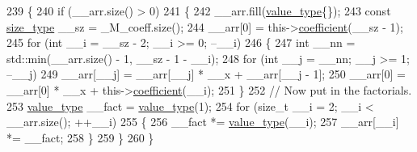 \begin{DoxyCode}
239         \{
240           \textcolor{keywordflow}{if} (\_\_arr.size() > 0)
241             \{
242               \_\_arr.fill(\hyperlink{class____gnu__cxx_1_1__StaticPolynomial_af23110f5a002cd6caa3542df7cf35284}{value\_type}\{\});
243               \textcolor{keyword}{const} \hyperlink{class____gnu__cxx_1_1__StaticPolynomial_a3384ce6a956ad398fc995e6ee53b2b18}{size\_type} \_\_sz = \_M\_coeff.size();
244               \_\_arr[0] = this->\hyperlink{class____gnu__cxx_1_1__StaticPolynomial_a412fc570171031ff0f45db048dfda225}{coefficient}(\_\_sz - 1);
245               \textcolor{keywordflow}{for} (\textcolor{keywordtype}{int} \_\_i = \_\_sz - 2; \_\_i >= 0; --\_\_i)
246                 \{
247                   \textcolor{keywordtype}{int} \_\_nn = std::min(\_\_arr.size() - 1, \_\_sz - 1 - \_\_i);
248                   \textcolor{keywordflow}{for} (\textcolor{keywordtype}{int} \_\_j = \_\_nn; \_\_j >= 1; --\_\_j)
249                     \_\_arr[\_\_j] = \_\_arr[\_\_j] * \_\_x + \_\_arr[\_\_j - 1];
250                   \_\_arr[0] = \_\_arr[0] * \_\_x + this->\hyperlink{class____gnu__cxx_1_1__StaticPolynomial_a412fc570171031ff0f45db048dfda225}{coefficient}(\_\_i);
251                 \}
252               \textcolor{comment}{//  Now put in the factorials.}
253               \hyperlink{class____gnu__cxx_1_1__StaticPolynomial_af23110f5a002cd6caa3542df7cf35284}{value\_type} \_\_fact = \hyperlink{class____gnu__cxx_1_1__StaticPolynomial_af23110f5a002cd6caa3542df7cf35284}{value\_type}(1);
254               \textcolor{keywordflow}{for} (\textcolor{keywordtype}{size\_t} \_\_i = 2; \_\_i < \_\_arr.size(); ++\_\_i)
255                 \{
256                   \_\_fact *= \hyperlink{class____gnu__cxx_1_1__StaticPolynomial_af23110f5a002cd6caa3542df7cf35284}{value\_type}(\_\_i);
257                   \_\_arr[\_\_i] *= \_\_fact;
258                 \}
259             \}
260         \}
\end{DoxyCode}
\mbox{\label{class____gnu__cxx_1_1__StaticPolynomial_a9519bb75237b79319607bbcce2ff92f8}} 
